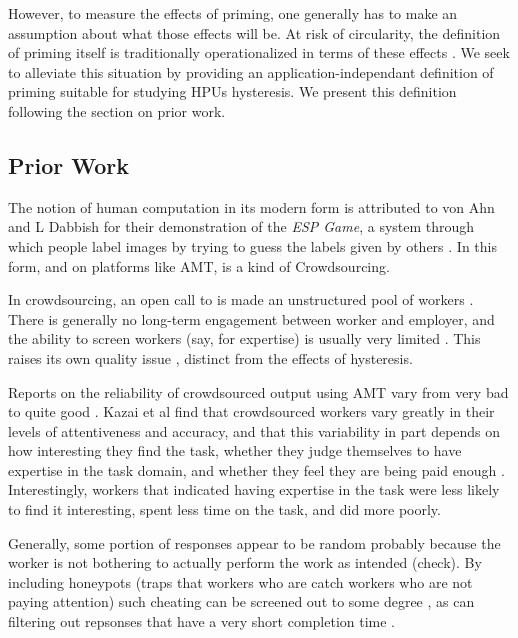 \documentclass[a4paper]{report}
\begin{document}
However, to measure the effects of priming, one generally has to make an 
assumption about what those effects will be.  At risk of circularity, the 
definition of priming itself is traditionally operationalized in terms 
of these effects \cite{}.  We seek to alleviate this 
situation by providing an application-independant definition of priming 
suitable for studying HPUs hysteresis.  We 
present this definition following the section on prior work.

\subsection*{Prior Work}

The notion of human computation in its modern form is attributed to von Ahn 
and L Dabbish for their demonstration of the \textit{ESP Game}, a system 
through which people label images by trying to guess the labels given by 
others \cite{von2004labeling}.  In this form, and on platforms like AMT,
is a kind of Crowdsourcing.  

In crowdsourcing, an open call to is made an unstructured pool of workers 
\cite{howe2008crowdsourcing}.  There is generally no long-term engagement 
between worker and employer, and the ability 
to screen workers (say, for expertise) is usually very limited 
\cite{howe2008crowdsourcing}.  This raises its own quality issue 
\cite{lease2011quality}, distinct from the effects of hysteresis. 

Reports on the reliability of crowdsourced output using AMT vary from very
bad \cite{marsden2009crowdsourcing} to quite good 
\cite{alonso2009can, grady2010crowdsourcing}. Kazai et al find that 
crowdsourced workers vary
greatly in their levels of attentiveness and accuracy, and that this 
variability in part depends on how interesting they find the task, whether they
judge
themselves to have expertise in the task domain, and whether they feel they
are being paid enough \cite{kazai2013analysis}.  Interestingly, workers that
indicated having expertise in the task were less likely to find it interesting,
spent less time on the task, and did more poorly.

Generally, some portion of responses appear to be random probably because
the worker is not bothering to actually perform the work as intended
\cite{lease2011quality}(check).  By including honeypots (traps that workers who are
catch workers who are not paying attention) such cheating can be screened out 
to some degree \cite{snow2008cheap}, as can filtering out repsonses
that have a very short completion time \cite{kazai2013analysis}.
\end{document}
